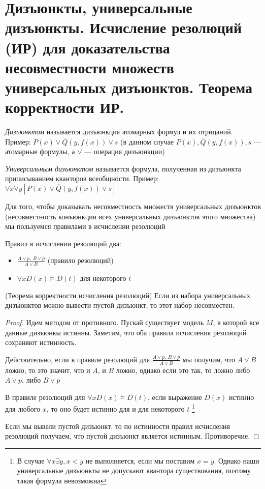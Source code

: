 \documentclass{article}
\begin{document}
\section{Дизъюнкты, универсальные дизъюнкты. Исчисление резолюций (ИР) для доказательства несовместности множеств универсальных дизъюнктов. Теорема корректности ИР.}
\begin{definition}
	\textit{Дизъюнктом} называется дизъюнкция атомарных формул и их отрицаний.\\
	Пример: $P(x) \vee \overline Q(y, f(x)) \vee s$ (в данном случае $P(x), \overline Q(y, f(x)), s$ --- атомарные формулы, а $\vee$ --- операция дизъюнкции)
\end{definition}
\begin{definition}
	\textit{Универсальным дизъюнктом} называется формула, полученная из дизъюнкта приписыванием кванторов всеобщности. Пример: $\forall x\forall y [P(x) \vee \overline Q(y, f(x)) \vee s]$
\end{definition}
Для того, чтобы доказывать несовместность множеств универсальных дизъюнктов (несовместность конъюнкции всех универсальных дизъюнктов этого множества) мы пользуемся правилами в исчислении резолюций
\vspace{2mm}

Правил в исчислении резолюций два:
\begin{itemize}
	\item $\tfrac{A \vee p,\ B \vee \overline p}{A \vee B}$ (правило резолюций)
	\item $\forall x D(x) \vDash D(t)$ для некоторого $t$
\end{itemize}

\begin{theorem}{(Теорема корректности исчисления резолюций)}
	Если из набора универсальных дизъюнктов можно вывести пустой дизъюнкт, то этот набор несовместен.
\end{theorem}
\begin{proof}
	Идем методом от противного. Пускай существует модель $M$, в которой все данные дизъюнкы истинны.
	Заметим, что оба правила исчисления резолюций сохраняют истинность.

	Действительно, если в правиле резолюций для $\tfrac{A \vee p,\ B \vee \overline p}{A \vee B}$ мы получим, что $A \vee B$ ложно, то это значит, что и $A$, и $B$ ложно, однако если это так, то ложно либо $A \vee p$, либо $B \vee \overline p$

	В правиле резолюций для $\forall x D(x) \vDash D(t)$, если выражение $D(x)$ истинно для любого
    $x$, то оно будет истинно для и для некоторого $t$ \footnote{В случае $\forall x \exists y, x < y$ не выполняется, если мы поставим $x = y$. Однако наши универсальные дизъюнкты не допускают квантора существования, поэтому такая формула невозможна}

	Если мы вывели пустой дизъюнкт, то по истинности правил исчисления резолюций получаем, что пустой дизъюнкт является истинным. Противоречие.
\end{proof}
\end{document}

